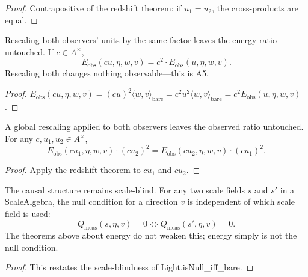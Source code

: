 \begin{proof}
Contrapositive of the redshift theorem: if $u_1 = u_2$, the cross-products are equal.
\end{proof}

\begin{theorem}
Rescaling both observers' units by the same factor leaves the energy ratio untouched. If $c \in A^\times$,
\begin{equation}
E_{\text{obs}}(cu, \eta, w, v) = c^2 \cdot E_{\text{obs}}(u, \eta, w, v) .
\end{equation}
Rescaling both changes nothing observable—this is A5.
\end{theorem}

\begin{proof}
$E_{\text{obs}}(cu, \eta, w, v) = (cu)^2 \langle w, v \rangle_{\text{bare}} = c^2 u^2 \langle w, v \rangle_{\text{bare}} = c^2 E_{\text{obs}}(u, \eta, w, v)$.
\end{proof}

\begin{theorem}[A5 is respected]
A global rescaling applied to both observers leaves the observed ratio untouched. For any $c, u_1, u_2 \in A^\times$,
\begin{equation}
E_{\text{obs}}(cu_1, \eta, w, v) \cdot (cu_2)^2 = E_{\text{obs}}(cu_2, \eta, w, v) \cdot (cu_1)^2 .
\end{equation}
\end{theorem}

\begin{proof}
Apply the redshift theorem to $cu_1$ and $cu_2$.
\end{proof}

\begin{theorem}
The causal structure remains scale-blind. For any two scale fields $s$ and $s'$ in a ScaleAlgebra, the null condition for a direction $v$ is independent of which scale field is used:
\begin{equation}
Q_{\text{meas}}(s, \eta, v) = 0 \iff Q_{\text{meas}}(s', \eta, v) = 0 .
\end{equation}
The theorems above about energy do not weaken this; energy simply is not the null condition.
\end{theorem}

\begin{proof}
This restates the scale-blindness of Light.isNull\_iff\_bare.
\end{proof}


